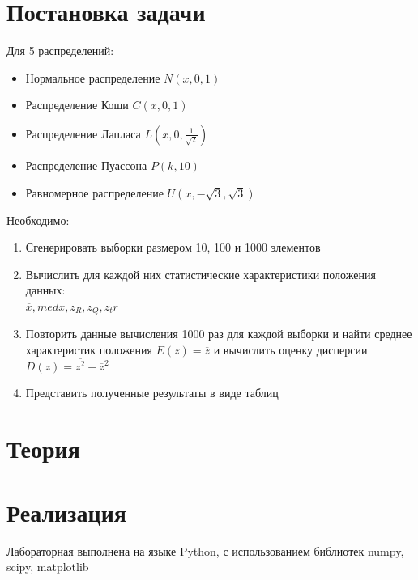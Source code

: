 \documentclass[12pt]{article}
\begin{document}


\tableofcontents
\clearpage

\listoffigures
\clearpage

\listoftables
\clearpage
 

\section{Постановка задачи}
Для 5 распределений:
\begin{itemize}
    \item Нормальное распределение $N(x,0,1)$
    \item Распределение Коши $C(x,0,1)$
    \item Распределение Лапласа $L(x,0,\frac{1}{\sqrt{2}})$
    \item Распределение Пуассона $P(k,10)$
    \item Равномерное распределение $U(x,-\sqrt{3},\sqrt{3})$
\end{itemize}

Необходимо:
\begin{enumerate}
    \item Сгенерировать выборки размером 10, 100 и 1000 элементов
    \item Вычислить для каждой них статистические характеристики положения данных: \\ $\overline{x}, med x, z_R, z_Q, z_tr$
    \item Повторить данные вычисления 1000 раз для каждой выборки и найти среднее характеристик положения $E(z)=\overline{z}$ и вычислить оценку дисперсии $D(z)=\overline{z^2}-{\overline{z}}^2$
    \item Представить полученные результаты в виде таблиц
\end{enumerate}


\section{Теория}




\section{Реализация}
Лабораторная выполнена на языке Python, с использованием библиотек numpy, scipy,
matplotlib
\end{document}

